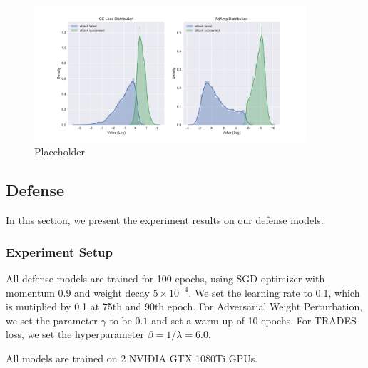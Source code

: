 \documentclass{article}
\begin{document}
    \begin{figure}[H]
        \centering
        \includegraphics[width=0.9\textwidth]{figs/ce_adamp_distribution.pdf}
        \caption{Placeholder}
        \label{fig:loss_distribution}
    \end{figure}
    \subsection{Defense}\label{sub:DefenseExp}
        In this section, we present the experiment results on our defense models.
        \subsubsection{Experiment Setup}\label{subs:DefenseExpSetup}
             All defense models are trained for 100 epochs, using SGD optimizer with momentum 0.9 and weight decay $5\times 10^{-4}$. We set the learning rate to 0.1, which is mutiplied by 0.1 at 75th and 90th epoch. For Adversarial Weight Perturbation, we set the parameter $\gamma$ to be $0.1$ and set a warm up of 10 epochs. For TRADES loss, we set the hyperparameter $\beta = 1/\lambda = 6.0$.

            All models are trained on 2 NVIDIA GTX 1080Ti GPUs.
\end{document}

